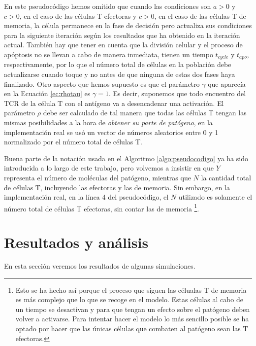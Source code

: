 En este pseudocódigo hemos omitido que cuando las condiciones son $a > 0$ y $c > 0$, en el caso de las células T efectoras y $c > 0$, en el caso de las células T de memoria, la célula permanece en la fase de decisión pero actualiza sus condiciones para la siguiente iteración según los resultados que ha obtenido en la iteración actual. También hay que tener en cuenta que la división celular y el proceso de apóptosis no se llevan a cabo de manera inmediata, tienen un tiempo $t_{cycle}$ y $t_{apo}$, respectivamente, por lo que el número total de células en la población debe actualizarse cuando toque y no antes de que ninguna de estas dos fases haya finalizado. Otro aspecto que hemos supuesto es que el parámetro $\gamma$ que aparecía en la Ecuación \ref{ec:rhotau} es $\gamma = 1$. Es decir, suponemos que todo encuentro del TCR de la célula T con el antígeno va a desencadenar una activación. El parámetro $\rho$ debe ser calculado de tal manera que todas las células T tengan las mismas posibilidades a la hora de \textit{obtener su parte de patógeno}, en la implementación real se usó un vector de números aleatorios entre 0 y 1 normalizado por el número total de células T.

Buena parte de la notación usada en el Algoritmo \ref{algo:pseudocodigo} ya ha sido introducida a lo largo de este trabajo, pero volvemos a insistir en que $Y$ representa el número de moléculas del patógeno, mientras que $N$ la cantidad total de células T, incluyendo las efectoras y las de memoria. Sin embargo, en la implementación real, en la línea 4 del pseudocódigo, el $N$ utilizado es solamente el número total de células T efectoras, sin contar las de memoria \footnote{Esto se ha hecho así porque el proceso que siguen las célualas T de memoria es más complejo que lo que se recoge en el modelo. Estas células al cabo de un tiempo se desactivan y para que tengan un efecto sobre el patógeno deben volver a activarse. Para intentar hacer el modelo lo más sencillo posible se ha optado por hacer que las únicas células que combaten al patógeno sean las T efectoras.}.

\section{Resultados y análisis}

En esta sección  veremos los resultados de algunas simulaciones. 

